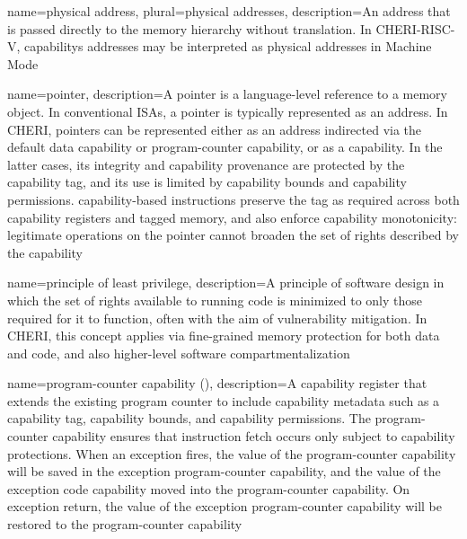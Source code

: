 {
  name=physical address,
  plural=physical addresses,
  description={An \gls{address} that is passed directly to the memory
    hierarchy without  translation.
    In \gls{CHERI-RISC-V}, \glspl{capability} addresses may be interpreted as
    physical addresses in Machine Mode}
}

{
  name=pointer,
  description={A pointer is a language-level reference to a memory object.
    In conventional ISAs, a pointer is typically represented as an
    \gls{address}.
    In CHERI, pointers can be represented either as an address
    indirected via the \gls{default data capability} or \gls{program-counter
    capability}, or as a \gls{capability}.
    In the latter cases, its integrity and \gls{capability provenance} are
    protected by the \gls{capability tag}, and its use is limited by
    \gls{capability bounds} and \gls{capability permissions}.
    \Gls{capability-based instructions} preserve the tag as required across
    both \glspl{capability register} and \gls{tagged memory}, and also
    enforce \gls{capability monotonicity}: legitimate operations on the
    pointer cannot broaden the set of rights described by the capability}
}

{
  name=principle of least privilege,
  description={A principle of software design in which the set of rights
    available to running code is minimized to only those required for it to
    function, often with the aim of \gls{vulnerability mitigation}.
    In CHERI, this concept applies via fine-grained memory protection for
    both data and code, and also higher-level \gls{software
    compartmentalization}}
}

{
  name=program-counter capability (\PCC{}),
  description={A \gls{capability register} that extends the existing
    program counter to include
    \gls{capability} metadata such as a \gls{capability tag}, \gls{capability
    bounds}, and \gls{capability permissions}.
    The program-counter capability ensures that instruction fetch occurs only
    subject to capability protections.
    When an exception fires, the value of the program-counter capability will
    be saved in the \gls{exception program-counter capability}, and the value
    of the \gls{exception code capability} moved into the program-counter
    capability.
    On exception return, the value of the exception program-counter capability
    will be restored to the program-counter capability}
}

